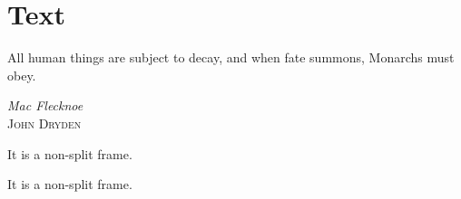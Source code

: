 \chapter{Text}
\label{ch:ch2}

\begin{singlespace} %
	\epigraph{All human things are subject to decay, and when fate summons, Monarchs must obey.}{\textit{Mac Flecknoe} \\ \textsc{John Dryden}}
\end{singlespace}

\begin{notice}
	It is a non-split frame.
\end{notice}

\begin{notice}
	\lipsum[6-7]
\end{notice}

\lipsum[8]

\begin{highlight}[Problem 1]
	It is a non-split frame.
\end{highlight}

\lipsum[9]

\begin{highlight}[Problem 2]
	\lipsum[10-12]
\end{highlight}